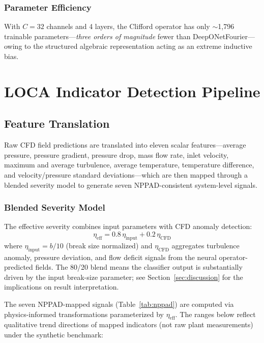 \documentclass[journal]{IEEEtran}
\begin{document}
\subsubsection{Parameter Efficiency}
With $C = 32$ channels and 4 layers, the Clifford operator has only $\sim$1,796 trainable parameters---\emph{three orders of magnitude} fewer than DeepONetFourier---owing to the structured algebraic representation acting as an extreme inductive bias.

\section{LOCA Indicator Detection Pipeline}
\label{sec:pipeline}

\subsection{Feature Translation}

Raw CFD field predictions are translated into eleven scalar features---average pressure, pressure gradient, pressure drop, mass flow rate, inlet velocity, maximum and average turbulence, average temperature, temperature difference, and velocity/pressure standard deviations---which are then mapped through a blended severity model to generate seven NPPAD-consistent system-level signals.

\subsubsection{Blended Severity Model}
The effective severity combines input parameters with CFD anomaly detection:
\begin{equation}
\eta_\text{eff} = 0.8\,\eta_\text{input} + 0.2\,\eta_\text{CFD}
\label{eq:severity}
\end{equation}
where $\eta_\text{input} = b/10$ (break size normalized) and $\eta_\text{CFD}$ aggregates turbulence anomaly, pressure deviation, and flow deficit signals from the neural operator-predicted fields. The 80/20 blend means the classifier output is substantially driven by the input break-size parameter; see Section~\ref{sec:discussion} for the implications on result interpretation.

The seven NPPAD-mapped signals (Table~\ref{tab:nppad}) are computed via physics-informed transformations parameterized by $\eta_\text{eff}$. The ranges below reflect qualitative trend directions of mapped indicators (not raw plant measurements) under the synthetic benchmark:
\end{document}
